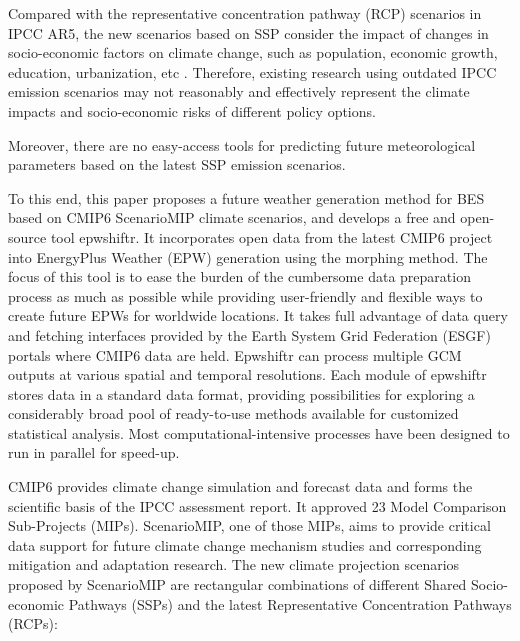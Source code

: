 \documentclass[twocolumn, a4paper,10pt]{article}
\makeatletter
\renewcommand\section{\@startsection{section}{1}{\z@}{3pt}{3pt}{\normalfont\large\bfseries}}
\makeatother
\begin{document}
Compared with the representative concentration pathway (RCP) scenarios in IPCC
AR5, the new scenarios based on SSP consider the impact of changes in
socio-economic factors on climate change, such as population, economic growth,
education, urbanization, etc \citep{chakraborty2021scenariobased}. Therefore,
existing research using outdated IPCC emission scenarios may not reasonably and
effectively represent the climate impacts and socio-economic risks of different
policy options.

Moreover, there are no easy-access tools for predicting future meteorological
parameters based on the latest SSP emission scenarios.

To this end, this paper proposes a future weather generation method for BES
based on CMIP6 ScenarioMIP climate scenarios, and develops a free and
open-source tool epwshiftr. It incorporates open data from the latest CMIP6
project into EnergyPlus Weather (EPW) generation using the morphing method. The
focus of this tool is to ease the burden of the cumbersome data preparation
process as much as possible while providing user-friendly and flexible ways to
create future EPWs for worldwide locations. It takes full advantage of data
query and fetching interfaces provided by the Earth System Grid Federation (ESGF)
portals where CMIP6 data are held. Epwshiftr can process multiple GCM outputs at
various spatial and temporal resolutions. Each module of epwshiftr stores data
in a standard data format, providing possibilities for exploring a considerably
broad pool of ready-to-use methods available for customized statistical
analysis. Most computational-intensive processes have been designed to run in
parallel for speed-up.

\section{Climate scenarios in CMIP6 ScenarioMIP}\label{climate-scenarios-in-cmip6-scenariomip}

CMIP6 provides climate change simulation and forecast data and forms the
scientific basis of the IPCC assessment report. It approved 23 Model Comparison
Sub-Projects (MIPs). ScenarioMIP, one of those MIPs, aims to provide critical
data support for future climate change mechanism studies and corresponding
mitigation and adaptation research. The new climate projection scenarios
proposed by ScenarioMIP are rectangular combinations of different Shared
Socio-economic Pathways (SSPs) and the latest Representative Concentration
Pathways (RCPs):
\end{document}
